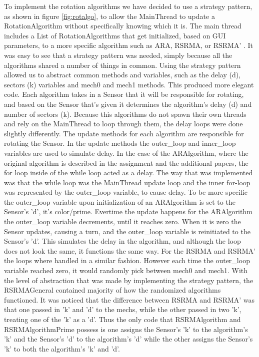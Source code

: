 To implement the rotation algorithms we have decided to use a strategy pattern, as shown in 
figure \ref{fig:rotalgo}, to allow the MainThread to update a RotationAlgorithm without specifically 
knowing which it is. The main thread includes a List of RotationAlgorithms that get 
initialized, based on GUI parameters, to a more specific algorithm such as ARA, RSRMA, or 
RSRMA' . It was easy to see that a strategy pattern was needed, simply because all the 
algorithms shared a number of things in common. Using the strategy pattern allowed us to 
abstract common methods and variables, such as the delay (d), sectors (k) variables and mech0 
and mech1 methods. This produced more elegant code. Each algorithm takes in a Sensor that it 
will be responsible for rotating, and based on the Sensor that's given it determines the 
algorithm's delay (d) and number of sectors (k).  Because this algorithms do not spawn their 
own threads and rely on the MainThread to loop through them, the delay loops were done slightly 
differently. The update methods for each algorithm are responsible for rotating the Sensor. In 
the update methods the outer\_loop and inner\_loop variables are used to simulate delay. In the 
case of the ARAlgorithm, where the original algorithm is described in the assignment and the 
additional papers, the for loop inside of the while loop acted as a delay. The way that was 
implemented was that the while loop was the MainThread update loop and the inner for-loop was 
represented by the outer\_loop variable, to cause delay. To be more specific the outer\_loop 
variable upon initialization of an ARAlgorithm is set to the Sensor's 'd', it's color/prime. 
Evertime the update happens for the ARAlgorithm the outer\_loop variable decrements, until it 
reaches  zero. When it is zero the Sensor updates, causing a turn, and the outer\_loop variable 
is reinitiated to the Sensor's 'd'. This simulates the delay in the algorithm, and although the 
loop does not look the same, it functions the same way. For the RSRMA and RSRMA' the loops 
where handled in a similar fashion. However each time the outer\_loop variable reached zero, it 
would randomly pick between mech0 and mech1. With the level of abstraction that was made by 
implementing the strategy pattern, the RSRMAGeneral contained majority of how the randomized 
algorithms functioned. It was noticed that the difference between RSRMA and RSRMA' was that one 
passed in 'k' and 'd' to the mechs, while the other passed in two 'k', treating one of the 'k' 
as a 'd'. Thus the only code that RSRMAlgorithm and RSRMAlgorithmPrime possess is one assigns 
the Sensor's 'k' to the algorithm's 'k' and the Sensor's 'd' to the algorithm's 'd' while the 
other assigns the Sensor's 'k' to both the algorithm's 'k' and 'd'.
